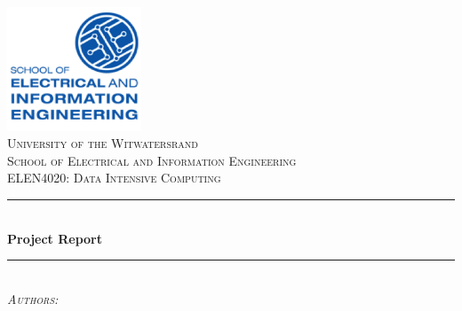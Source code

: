 \documentclass[11pt,twocolumn]{witseiepaper}
\begin{document}
	
	\begin{titlepage}
		
		\newcommand{\HRule}{\rule{\linewidth}{0.3mm}} %
		
		\center %
		
		\includegraphics[width=0.3\textwidth]{EIE.png}\\[1cm] %
		
		\textsc{\LARGE University of the Witwatersrand } \\[0.1cm] %
		\textsc{\LARGE School of Electrical and Information Engineering }\\[1cm] %
		\textsc{\Large ELEN4020: Data Intensive Computing}\\[1cm] %
		
		
		\HRule \\[0.4cm]
		{ \huge \bfseries Project Report} \\[0.4cm] %
		\HRule \\[1cm]
		
		\textsc{\Large 	\emph{Authors:} } \\[0.1cm]	 
		

\end{titlepage}
\end{document}
